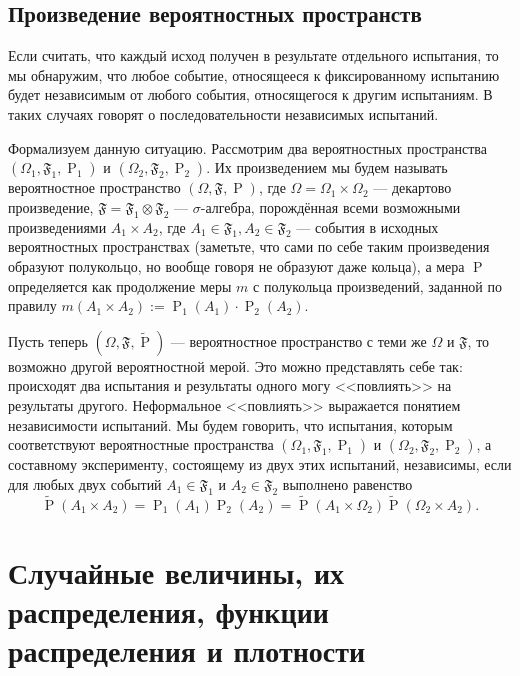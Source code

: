 \documentclass[12pt]{article}
\numberwithin{theorem}{section}
\theoremstyle{definition}
\newcommand{\prob}{\operatorname{P}}
\newcommand{\defin}[2]{\hypertarget{#2}{{\color{red} #1}}}
\newcommand{\events}{\mathfrak{F}}
\begin{document}
	\subsection{Произведение вероятностных пространств}
	
	Если считать, что каждый исход получен в результате отдельного испытания,
	то мы обнаружим, что любое событие, относящееся к фиксированному испытанию
	будет независимым от любого события, относящегося к другим испытаниям.
	В таких случаях говорят о последовательности независимых испытаний.
	
	Формализуем данную ситуацию. Рассмотрим два вероятностных пространства $ (\Omega_1, \events_1, \prob_1) $
	и $ (\Omega_2, \events_2, \prob_2) $. Их \defin{произведением}{product-of-probability-spaces} мы будем называть вероятностное пространство
	$ (\Omega, \events, \prob) $, где $ \Omega = \Omega_1 \times \Omega_2 $ --- декартово произведение,
	$ \events = \events_1 \otimes \events_2 $ --- $ \sigma $-алгебра, порождённая всеми возможными произведениями $ A_1 \times A_2 $,
	где $ A_1 \in \events_1, A_2 \in \events_2 $ --- события в исходных вероятностных пространствах
	(заметьте, что сами по себе таким произведения образуют полукольцо, но вообще говоря не образуют даже кольца),
	а мера $ \prob $ определяется как продолжение меры $ m $ с полукольца произведений, заданной по правилу
	$ m(A_1 \times A_2) := \prob_1(A_1)\cdot \prob_2(A_2) $.
	
	Пусть теперь $ (\Omega, \events, \tilde{\prob}) $ --- вероятностное пространство с теми же $ \Omega $
	и $ \events $, то возможно другой вероятностной мерой. 
	Это можно представлять себе так: происходят два испытания и результаты одного могу <<повлиять>> на результаты другого. 
	Неформальное <<повлиять>> выражается понятием независимости испытаний.
	Мы будем говорить, что испытания, которым соответствуют вероятностные пространства
	$ (\Omega_1, \events_1, \prob_1) $ и $ (\Omega_2, \events_2, \prob_2) $,
	а составному эксперименту, состоящему из двух этих испытаний, \defin{независимы}{independent-experiments},
	если для любых двух событий $ A_1 \in \events_1 $ и $ A_2 \in \events_2 $ выполнено равенство
	$$ \tilde{\prob}(A_1 \times A_2) = \prob_1(A_1)\prob_2(A_2) 
	= \tilde{\prob}(A_1 \times \Omega_2)\tilde{\prob}(\Omega_2 \times A_2). $$

	\section{Случайные величины, их распределения, функции распределения и плотности}
	
\end{document}
